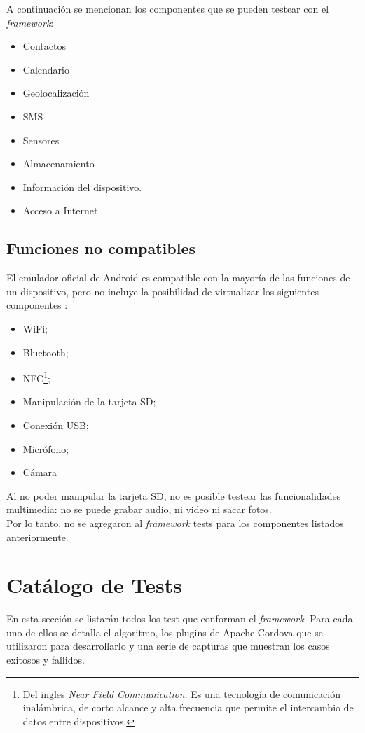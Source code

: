 A continuación se mencionan los componentes que se pueden testear con el \textit{framework}:
\begin{itemize}
	\item Contactos
	\item Calendario
	\item Geolocalización
	\item SMS
	\item Sensores
	\item Almacenamiento
	\item Información del dispositivo.
	\item Acceso a Internet
\end{itemize}
\subsection{Funciones no compatibles}
El emulador oficial de Android es compatible con la mayoría de las funciones de un dispositivo, pero no incluye la posibilidad de virtualizar los siguientes componentes \cite{daemu}:
\begin{itemize}
    \item WiFi;
    \item Bluetooth;
    \item NFC\footnote{Del ingles \emph{Near Field Communication}. Es una tecnología de comunicación inalámbrica, de corto alcance y alta frecuencia que permite el intercambio de datos entre dispositivos.};
    \item Manipulación de la tarjeta SD;
    \item Conexión USB;
    \item Micrófono;
    \item Cámara
\end{itemize}
Al no poder manipular la tarjeta SD, no es posible testear las funcionalidades multimedia: no se puede grabar audio, ni video ni sacar fotos.\\

Por lo tanto, no se agregaron al \textit{framework} tests para los componentes listados anteriormente.
\section{Catálogo de Tests}
En esta sección se listarán todos los test que conforman el \textit{framework}. Para cada uno de ellos se detalla el algoritmo, los plugins de Apache Cordova que se utilizaron para desarrollarlo y una serie de capturas que muestran los casos exitosos y fallidos.\\

